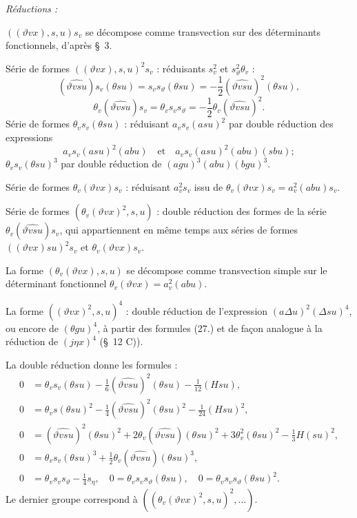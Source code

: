 \documentclass[11pt]{article}
\newcommand{\A}{\Delta}
\begin{document}
\noindent\emph{Réductions :}

$((\vartheta v x),s,u)s_v$ se décompose comme transvection sur des déterminants fonctionnels, d'après \S\ 3.

Série de formes $((\vartheta v x),s,u)^2s_v$ : réduisants $s_v^2$ et $s_\vartheta^2\theta_v$ :
\[
(\widehat{\vartheta v su})s_v(\theta su)=s_v s_\vartheta(\theta su)=-\frac12(\widehat{\vartheta v su})^2(\theta su),
\]
\[
\theta_v(\widehat{\vartheta v su})s_v=\theta_v s_v s_\vartheta=-\frac12\theta_v(\widehat{\vartheta v su})^2.
\]
Série de formes $\theta_v s_v(\theta su)$ : réduisant $a_v s_v(asu)^2$ par double réduction des expressions
\[
a_v s_v(asu)^2(abu)\quad\text{et}\quad a_v s_v(asu)^2(abu)(sbu);
\]
$\theta_v s_v(\theta su)^3$ par double réduction de $(agu)^3(abu)(bgu)^3$.

Série de formes $\theta_v(\vartheta v x)s_v$ : réduisant $a_v^2s_v$ issu de $\theta_v(\vartheta v x)s_v=a_v^2(abu)s_v$.

Série de formes $(\theta_v(\vartheta v x)^2,s,u)$ : double réduction des formes de la série $\theta_v(\widehat{\vartheta v su})s_v$, qui appartiennent en même temps aux séries de formes $((\vartheta v x)su)^2s_v$ et $\theta_v(\vartheta v x)s_v$.

La forme $(\theta_v(\vartheta v x),s,u)$ se décompose comme transvection simple sur le déterminant fonctionnel $\theta_v(\vartheta v x)=a_v^2(abu)$.

La forme $((\vartheta v x)^2,s,u)^4$ : double réduction de l'expression $(a\A u)^2(\A su)^4$, ou encore de $(\theta gu)^4$, à partir des formules (27.) et de façon analogue à la réduction de $(j\eta x)^4$ (\S\ 12 C)).

La double réduction donne les formules :
\[
\tag{28}
\begin{aligned}
0&=\theta_v s_v(\theta su)-\frac16(\widehat{\vartheta v su})^2(\theta su)-\frac1{12}(Hsu),\\
0&=\theta_v s(\theta su)^2-\frac14(\widehat{\vartheta v su})^2(\theta su)^2-\frac1{24}(Hsu)^2,\\
0&=(\widehat{\vartheta v su})^2(\theta su)^2+2\theta_v(\widehat{\vartheta v su})(\theta su)^2
  +3\theta_v^2(\theta su)^2-\frac13H(su)^2,\\
0&=\theta_v s_v(\theta su)^3+\frac12\theta_v(\widehat{\vartheta v su})(\theta su)^3,\\
0&=\theta_v s_v s_\vartheta-\frac14s_\eta,
\quad 0=\theta_v s_v s_\vartheta(\theta su),
\quad 0=\theta_v s_v s_\vartheta(\theta su)^2.
\end{aligned}
\]
Le dernier groupe correspond à $((\theta_v(\vartheta v x)^2,s,u)^2,\ldots)$.
\end{document}
